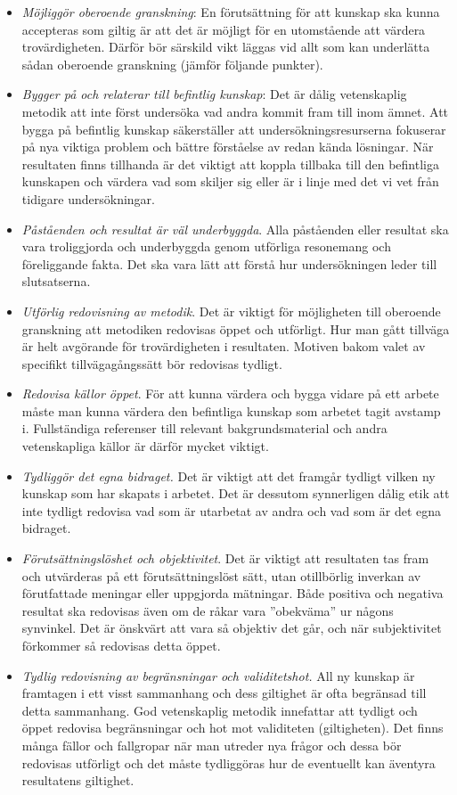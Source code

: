 \begin{itemize}
\item
  \emph{Möjliggör oberoende granskning}: En förutsättning för att
  kunskap ska kunna accepteras som giltig är att det är möjligt för en
  utomstående att värdera trovärdigheten. Därför bör särskild vikt
  läggas vid allt som kan underlätta sådan oberoende granskning (jämför
  följande punkter).
\item
  \emph{Bygger på och relaterar till befintlig kunskap}: Det är dålig
  vetenskaplig metodik att inte först undersöka vad andra kommit fram
  till inom ämnet. Att bygga på befintlig kunskap säkerställer att
  undersökningsresurserna fokuserar på nya viktiga problem och bättre
  förståelse av redan kända lösningar. När resultaten finns tillhanda är
  det viktigt att koppla tillbaka till den befintliga kunskapen och
  värdera vad som skiljer sig eller är i linje med det vi vet från
  tidigare undersökningar.
\item
  \emph{Påståenden och resultat är väl underbyggda}. Alla påståenden
  eller resultat ska vara troliggjorda och underbyggda genom utförliga
  resonemang och föreliggande fakta. Det ska vara lätt att förstå hur
  undersökningen leder till slutsatserna.
\item
  \emph{Utförlig redovisning av metodik}. Det är viktigt för möjligheten
  till oberoende granskning att metodiken redovisas öppet och utförligt.
  Hur man gått tillväga är helt avgörande för trovärdigheten i
  resultaten. Motiven bakom valet av specifikt tillvägagångssätt bör
  redovisas tydligt.
\item
  \emph{Redovisa källor öppet}. För att kunna värdera och bygga vidare
  på ett arbete måste man kunna värdera den befintliga kunskap som
  arbetet tagit avstamp i. Fullständiga referenser till relevant
  bakgrundsmaterial och andra vetenskapliga källor är därför mycket
  viktigt.
\item
  \emph{Tydliggör det egna bidraget.} Det är viktigt att det framgår
  tydligt vilken ny kunskap som har skapats i arbetet. Det är dessutom
  synnerligen dålig etik att inte tydligt redovisa vad som är utarbetat
  av andra och vad som är det egna bidraget.
\item
  \emph{Förutsättningslöshet och objektivitet}. Det är viktigt att
  resultaten tas fram och utvärderas på ett förutsättningslöst sätt,
  utan otillbörlig inverkan av förutfattade meningar eller uppgjorda
  mätningar. Både positiva och negativa resultat ska redovisas även om
  de råkar vara ''obekväma'' ur någons synvinkel. Det är önskvärt att
  vara så objektiv det går, och när subjektivitet förkommer så redovisas
  detta öppet.
\item
  \emph{Tydlig redovisning av begränsningar och validitetshot.} All ny
  kunskap är framtagen i ett visst sammanhang och dess giltighet är ofta
  begränsad till detta sammanhang. God vetenskaplig metodik innefattar
  att tydligt och öppet redovisa begränsningar och hot mot validiteten
  (giltigheten). Det finns många fällor och fallgropar när man utreder
  nya frågor och dessa bör redovisas utförligt och det måste tydliggöras
  hur de eventuellt kan äventyra resultatens giltighet.
\end{itemize}

